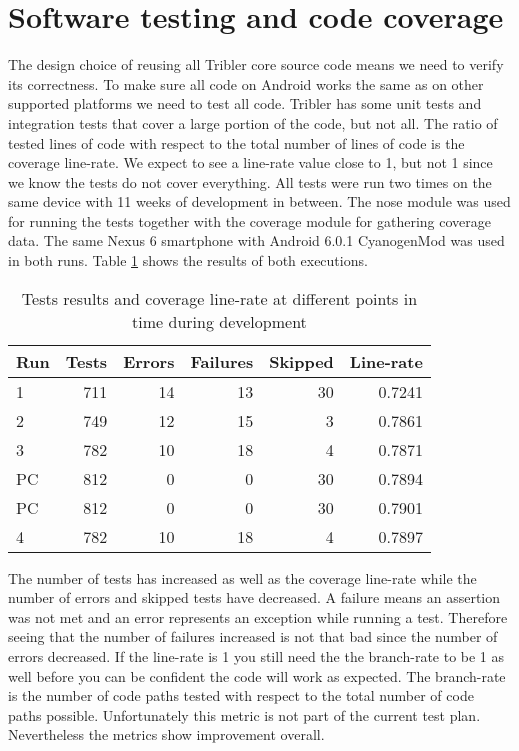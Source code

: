 \section{Software testing and code coverage}\label{sec:testing_coverage}
The design choice of reusing all Tribler core source code means we need to verify its correctness.
To make sure all code on Android works the same as on other supported platforms we need to test all code.
Tribler has some unit tests and integration tests that cover a large portion of the code, but not all.
The ratio of tested lines of code with respect to the total number of lines of code is the coverage line-rate.
We expect to see a line-rate value close to 1, but not 1 since we know the tests do not cover everything.
All tests were run two times on the same device with 11 weeks of development in between.
The nose module was used for running the tests together with the coverage module for gathering coverage data.
The same Nexus 6 smartphone with Android 6.0.1 CyanogenMod was used in both runs.
Table \ref{table:testing_coverage} shows the results of both executions.
\begin{table}[H]
	\begin{tabular}{l | *{5}{r}} \hline
		Run & Tests & Errors & Failures & Skipped & Line-rate \\ \hline \hline
		1     & 711   & 14       & 13          & 30          & 0.7241 \\ \hline
		2     & 749   & 12       & 15          & 3            & 0.7861 \\ \hline
		3	  & 782	  & 10		 & 18		   & 4			  & 0.7871 \\ \hline
		PC   & 812   & 0         & 0            & 30          & 0.7894 \\ \hline
		PC   & 812   & 0         & 0            & 30          & 0.7901 \\ \hline
		4     & 782   & 10       & 18          & 4            & 0.7897 \\ \hline
	\end{tabular}
	\caption{Tests results and coverage line-rate at different points in time during development}
	\label{table:testing_coverage}
\end{table}

The number of tests has increased as well as the coverage line-rate while the number of errors and skipped tests have decreased.
A failure means an assertion was not met and an error represents an exception while running a test.
Therefore seeing that the number of failures increased is not that bad since the number of errors decreased.
If the line-rate is 1 you still need the the branch-rate to be 1 as well before you can be confident the code will work as expected.
The branch-rate is the number of code paths tested with respect to the total number of code paths possible.
Unfortunately this metric is not part of the current test plan.
Nevertheless the metrics show improvement overall.

